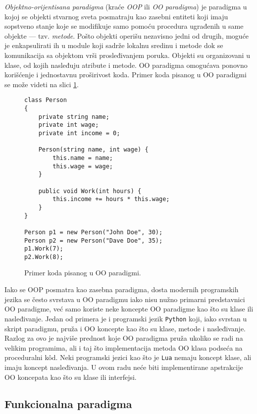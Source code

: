 \emph{Objektno-orijentisana paradigma} (kraće \emph{OOP} ili \emph{OO paradigma}) je paradigma u kojoj se objekti stvarnog sveta posmatraju kao zasebni entiteti koji imaju sopstveno stanje koje se modifikuje samo pomoću procedura ugrađenih u same objekte --- tzv. \emph{metode}. Pošto objekti operišu nezavisno jedni od drugih, moguće je enkapsulirati ih u module koji sadrže lokalnu sredinu i metode dok se komunikacija sa objektom vrši prosleđivanjem poruka. Objekti su organizovani u klase, od kojih nasleđuju atribute i metode. OO paradigma omogućava ponovno korišćenje i jednostavnu proširivost koda. Primer koda pisanog u OO paradigmi se može videti na slici \ref{fig:ParadigmOO}.

\begin{figure}[h!]
\begin{lstlisting}
class Person
{
    private string name;
    private int wage;
    private int income = 0;

    Person(string name, int wage) {
        this.name = name;
        this.wage = wage;
    }

    public void Work(int hours) {
        this.income += hours * this.wage;
    }
}

Person p1 = new Person("John Doe", 30);
Person p2 = new Person("Dave Doe", 35);
p1.Work(7);
p2.Work(8);
\end{lstlisting}
\caption{Primer koda pisanog u OO paradigmi.}
\label{fig:ParadigmOO}
\end{figure}

Iako se OOP posmatra kao zasebna paradigma, dosta modernih programskih jezika se često svrstava u OO paradigmu iako nisu nužno primarni predstavnici OO paradigme, već samo koriste neke koncepte OO paradigme kao što su klase ili nasleđivanje. Jedan od primera je i programski jezik \texttt{Python} koji, iako svrstan u skript paradigmu, pruža i OO koncepte kao što su klase, metode i nasleđivanje. Razlog za ovo je najviše prednost koje OO paradigma pruža ukoliko se radi na velikim programima, ali i taj što implementacija metoda OO klasa podseća na proceduralni k\^od. Neki programski jezici kao što je \texttt{Lua} nemaju koncept klase, ali imaju koncept nasleđivanja. U ovom radu neće biti implementirane apstrakcije OO koncepata kao što su klase ili interfejsi.

\subsection{Funkcionalna paradigma}
\label{subsec:ParadigmFunctional}

